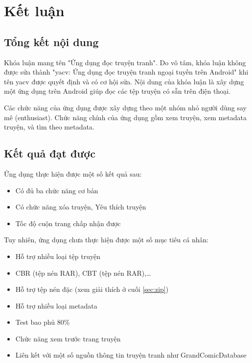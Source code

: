 \documentclass[../../thesis]{subfiles}
\begin{document}
\chapter{Kết luận}\label{chap:conclusion}

\section{Tổng kết nội dung}\label{sec:summary}

Khóa luận mang tên "Ứng dụng đọc truyện tranh". Do vô tâm, khóa luận không được
sửa thành "yacv: Ứng dụng đọc truyện tranh ngoại tuyến trên Android" khi tên
yacv được quyết định và có cơ hội sửa. Nội dung của khóa luận là xây dựng một
ứng dụng trên Android giúp đọc các tệp truyện có sẵn trên điện thoại.

Các chức năng của ứng dụng được xây dựng theo một nhóm nhỏ người dùng say mê
(enthusiast). Chức năng chính của ứng dụng gồm xem truyện, xem metadata truyện,
và tìm theo metadata.

\section{Kết quả đạt được}\label{sec:thesis_result}

Ứng dụng thực hiện được một số kết quả sau:

\begin{itemize}
    \item Có đủ ba chức năng cơ bản
    \item Có chức năng xóa truyện, Yêu thích truyện
    \item Tốc độ cuộn trang chấp nhận được
\end{itemize}

Tuy nhiên, ứng dụng chưa thực hiện được một số mục tiêu cá nhân:

\begin{itemize}
    \item Hỗ trợ nhiều loại tệp truyện
        \item CBR (tệp nén RAR), CBT (tệp nén RAR),\ldots
        \item Hỗ trợ tệp nén đặc (xem giải thích ở cuối \autoref{sec:zip})
    \item Hỗ trợ nhiều loại metadata
    \item Test bao phủ 80\%
    \item Chức năng xem trước trang truyện
    \item Liên kết với một số nguồn thông tin truyện tranh như
        GrandComicDatabase
\end{itemize}
\end{document}
